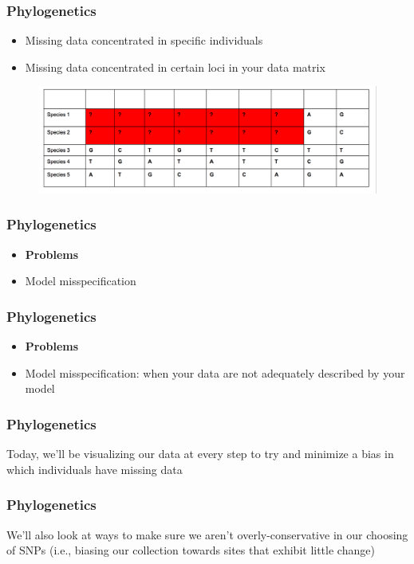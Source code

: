 \documentclass{beamer}
\begin{document}
\begin{frame}
\frametitle{Phylogenetics}
\begin{itemize}
\item Missing data concentrated in specific individuals
\item Missing data concentrated in certain loci in your data matrix
\end{itemize}
\begin{figure}
    \includegraphics[scale=0.25]{bysite.png}
    \end{figure}
\end{frame}

\begin{frame}
\frametitle{Phylogenetics}
\begin{itemize}
\item \textbf{Problems}
\item Model misspecification

\end{itemize}
\end{frame}

\begin{frame}
\frametitle{Phylogenetics}
\begin{itemize}
\item \textbf{Problems}
\item Model misspecification: when your data are not adequately described by your model
\end{itemize}
\end{frame}

\begin{frame}
\frametitle{Phylogenetics}
Today, we'll be visualizing our data at every step to try and minimize a bias in which individuals have missing data
\end{frame}

\begin{frame}
\frametitle{Phylogenetics}
We'll also look at ways to make sure we aren't overly-conservative in our choosing of SNPs (i.e., biasing our collection towards sites that exhibit little change)
\end{frame}
\end{document}
